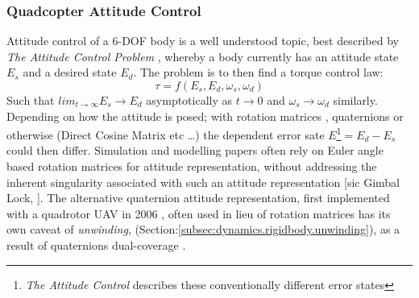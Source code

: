 \subsubsection*{Quadcopter Attitude Control}
Attitude control of a 6-DOF body is a well understood topic, best described by \emph{The Attitude Control Problem} \cite{attitudecontrolproblem}, whereby a body currently has an attitude state $E_s$ and a desired state $E_d$. The problem is to then find a torque control law:
\begin{equation} \label{eq:2}
\tau = f(E_s,E_d,\omega_s,\omega_d)
\end{equation}
Such that $lim_{t\rightarrow\infty}E_s \rightarrow E_d$ asymptotically as $t \rightarrow 0$ and $\omega_s \rightarrow \omega_d$ similarly. Depending on how the attitude is posed; with rotation matrices \cite{rigidbodylecture,eulerrigidbody,rotationsequences}, quaternions \cite{quaterniondynamics, rotationsequences, spacecraftattitutdequaternions} or otherwise (Direct Cosine Matrix etc \ldots) the dependent error sate $E$\footnote{\emph{The Attitude Control} \cite{attitudecontrolproblem} describes these conventionally different error states}$= E_d - E_s$ could then differ. Simulation and modelling papers often rely on Euler angle based rotation matrices for attitude representation, \cite{quadsimulationcontrol, adaptivedisturbancecontrol, optimizedpidquadcopter, singleaxistilting, backsteppingquadcoptercontrol, fullquadcoptercontrol} without addressing the inherent singularity associated with such an attitude representation [sic Gimbal Lock, \cite{euleranglesingularity}]. The alternative quaternion attitude representation, first implemented with a quadrotor UAV in 2006 \cite{attitudestabilization}, often used in lieu of rotation matrices has its own caveat of \emph{unwinding}, (Section:\ref{subsec:dynamics.rigidbody.unwinding}), as a result of quaternions dual-coverage \cite{unwinding}.
\par




